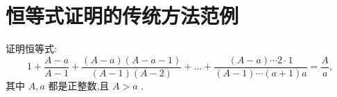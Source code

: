 \section{恒等式证明的传统方法范例}

\begin{example}\label{example:例1}
  证明恒等式: \[1 + \frac{A - a}{A - 1} + \frac{\left( {A - a}\right) \left( {A - a - 1}\right) }{\left( {A - 1}\right) \left( {A - 2}\right) } + \ldots  + \frac{\left( {A - a}\right) \cdots 2 \cdot  1}{\left( {A - 1}\right) \cdots \left( {a + 1}\right) a} = \frac{A}{a} ,\]
  其中 \(A,a\) 都是正整数,且 \(A > a\) . 
\end{example}











